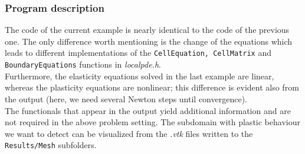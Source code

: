 \subsubsection{Program description}

The code of the current example is nearly identical to the code of the previous one. The only difference worth mentioning is the change of the equations which leads to different implementations of the \texttt{CellEquation, CellMatrix} and \texttt{BoundaryEquations} functions in \textit{localpde.h}.\\
Furthermore, the elasticity equations solved in the last example are linear, whereas the plasticity equations are nonlinear; this difference is evident also from the output (here, we need several Newton steps until convergence).\\
The functionals that appear in the output yield additional information and are not required in the above problem setting. The subdomain with plastic behaviour we want to detect can be visualized from the \textit{.vtk} files written to the \texttt{Results/Mesh} subfolders.